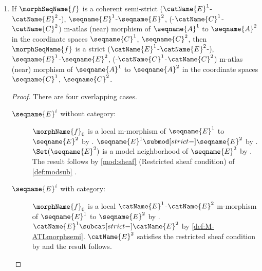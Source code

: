 \documentclass{article}
\begin{document}
\begin{lemma}
\begin{enumerate}
\begin{proof}
\begin{description}
\item[$\seqname{E}^i$ with category:]
$\morphName{f}_0$ is an $\catName{E}^1$-$\catName{E}^2$ m-morphism of
$\seqname{E}^1$ to $\seqname{E}^2$ by \cref{def:M-ATLmorphstrict}.
$\morphName{f}_0$ is a local $\catName{E}^1$-$\catName{E}^2$ m-morphism
of $\seqname{E}^1$ to $\seqname{E}^2$ by \cref{lem:modMmorph}.

\item[$\seqname{C}^i$ with category:]
$\morphName{f}_1$ is a $\catName{C}^1$-$\catName{C}^2$ m-morphism of
$\seqname{C}^1$ to $\seqname{C}^2$ by \cref{def:M-ATLmorphstrict}.
$\morphName{f}_1$ is a local $\catName{C}^1$-$\catName{C}^2$ m-morphism
of $\seqname{C}^1$ to $\seqname{C}^2$ by \cref{lem:modMmorph}.

\end{description}
\end{proof}

\item
\label{M-ATLmorph:strictSstrictisstrict}
If $\morphSeqName{f}$ is a coherent semi-strict
\nobreaks
  {
    {($\catName{E}^1$-$\catName{E}^2$-)},
    {$\seqname{E}^1$-$\seqname{E}^2$},
    {(-$\catName{C}^1$-$\catName{C}^2$)}
  }
m-atlas (near) morphism of $\seqname{A}^1$ to $\seqname{A}^2$ in the
coordinate spaces $\seqname{C}^1$, $\seqname{C}^2$, then
$\morphSeqName{f}$ is a strict
\nobreaks
  {
    {($\catName{E}^1$-$\catName{E}^2$-)},
    {$\seqname{E}^1$-$\seqname{E}^2$},
    {(-$\catName{C}^1$-$\catName{C}^2$)}
  }
m-atlas (near) morphism of $\seqname{A}^1$ to $\seqname{A}^2$ in the
coordinate spaces $\seqname{C}^1$, $\seqname{C}^2$.

\begin{proof}
There are four overlapping cases.
\begin{description}
\item[$\seqname{E}^i$ without category:]
\leavevmode
$\morphName{f}_0$ is a local m-morphism of $\seqname{E}^1$ to
$\seqname{E}^2$ by .
$\seqname{E}^1 \submod[strict-] \seqname{E}^2$ by .
$\Set(\seqname{E}^2)$ is a model neighborhood of $\seqname{E}^2$ by .
The result follows by \cref{mod:sheaf} (Restricted sheaf condition) of
{
  \showlabelsinline
  \cref{def:modsub}
}.

\item[$\seqname{E}^i$ with category:]
\leavevmode
$\morphName{f}_0$ is a local $\catName{E}^1$-$\catName{E}^2$ m-morphism
of $\seqname{E}^1$ to $\seqname{E}^2$ by .
$\catName{E}^1 \subcat[strict-] \catName{E}^2$ by
\cref{def:M-ATLmorphsemi}.  $\catName{E}^2$ satisfies the restricted
sheaf condition by  and the result follows.


\end{description}
\end{proof}
\end{enumerate}
\end{lemma}
\end{document}
